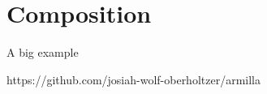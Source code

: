\section{Composition}

\begin{frame}{A big example}

https://github.com/josiah-wolf-oberholtzer/armilla

\end{frame}